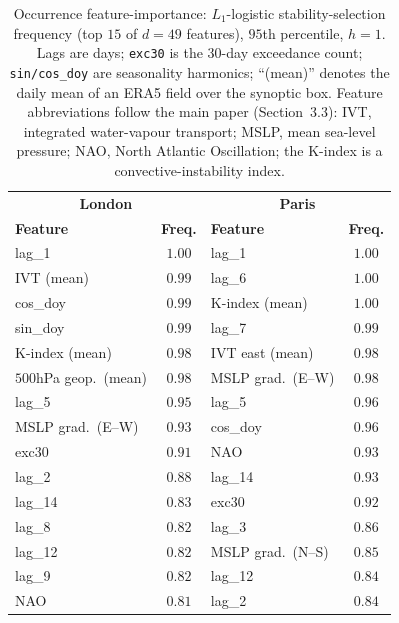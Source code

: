 \documentclass[11pt,a4paper]{article}
\begin{document}
\begin{table}[h]
\centering\small
\caption{Occurrence feature-importance: $L_1$-logistic stability-selection
frequency (top $15$ of $d=49$ features), $95$th percentile, $h=1$. Lags are
days; \texttt{exc30} is the $30$-day exceedance count; \texttt{sin/cos\_doy}
are seasonality harmonics; ``(mean)'' denotes the daily mean of an ERA5 field
over the synoptic box. Feature abbreviations follow the main paper
(Section~3.3): IVT, integrated water-vapour transport; MSLP, mean sea-level
pressure; NAO, North Atlantic Oscillation; the K-index is a convective-instability
index.}
\label{tab:supp-stability}
\begin{tabular}{lc@{\qquad}lc}
\toprule
\multicolumn{2}{c}{\textbf{London}} & \multicolumn{2}{c}{\textbf{Paris}}\\
\textbf{Feature} & \textbf{Freq.} & \textbf{Feature} & \textbf{Freq.}\\
\midrule
lag\_1                  & $1.00$ & lag\_1                  & $1.00$ \\
IVT (mean)              & $0.99$ & lag\_6                  & $1.00$ \\
cos\_doy                & $0.99$ & K-index (mean)          & $1.00$ \\
sin\_doy                & $0.99$ & lag\_7                  & $0.99$ \\
K-index (mean)          & $0.98$ & IVT east (mean)         & $0.98$ \\
$500$hPa geop.\ (mean)  & $0.98$ & MSLP grad.\ (E--W)      & $0.98$ \\
lag\_5                  & $0.95$ & lag\_5                  & $0.96$ \\
MSLP grad.\ (E--W)      & $0.93$ & cos\_doy                & $0.96$ \\
exc30                   & $0.91$ & NAO                     & $0.93$ \\
lag\_2                  & $0.88$ & lag\_14                 & $0.93$ \\
lag\_14                 & $0.83$ & exc30                   & $0.92$ \\
lag\_8                  & $0.82$ & lag\_3                  & $0.86$ \\
lag\_12                 & $0.82$ & MSLP grad.\ (N--S)      & $0.85$ \\
lag\_9                  & $0.82$ & lag\_12                 & $0.84$ \\
NAO                     & $0.81$ & lag\_2                  & $0.84$ \\
\bottomrule
\end{tabular}
\end{table}
\end{document}
